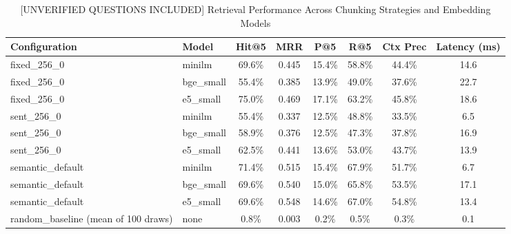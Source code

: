 \begin{table}[t]
\centering
\caption{[UNVERIFIED QUESTIONS INCLUDED] Retrieval Performance Across Chunking Strategies and Embedding Models}
\label{tab:retrieval_summary}
\begin{tabular}{llcccccc}
\toprule
\textbf{Configuration} & \textbf{Model} & \textbf{Hit@5} & \textbf{MRR} & \textbf{P@5} & \textbf{R@5} & \textbf{Ctx Prec} & \textbf{Latency (ms)} \\
\midrule
fixed\_256\_0 & minilm & 69.6\% & 0.445 & 15.4\% & 58.8\% & 44.4\% & 14.6 \\
fixed\_256\_0 & bge\_small & 55.4\% & 0.385 & 13.9\% & 49.0\% & 37.6\% & 22.7 \\
fixed\_256\_0 & e5\_small & 75.0\% & 0.469 & 17.1\% & 63.2\% & 45.8\% & 18.6 \\
sent\_256\_0 & minilm & 55.4\% & 0.337 & 12.5\% & 48.8\% & 33.5\% & 6.5 \\
sent\_256\_0 & bge\_small & 58.9\% & 0.376 & 12.5\% & 47.3\% & 37.8\% & 16.9 \\
sent\_256\_0 & e5\_small & 62.5\% & 0.441 & 13.6\% & 53.0\% & 43.7\% & 13.9 \\
semantic\_default & minilm & 71.4\% & 0.515 & 15.4\% & 67.9\% & 51.7\% & 6.7 \\
semantic\_default & bge\_small & 69.6\% & 0.540 & 15.0\% & 65.8\% & 53.5\% & 17.1 \\
semantic\_default & e5\_small & 69.6\% & 0.548 & 14.6\% & 67.0\% & 54.8\% & 13.4 \\
random\_baseline (mean of 100 draws) & none & 0.8\% & 0.003 & 0.2\% & 0.5\% & 0.3\% & 0.1 \\
\bottomrule
\end{tabular}
\end{table}
